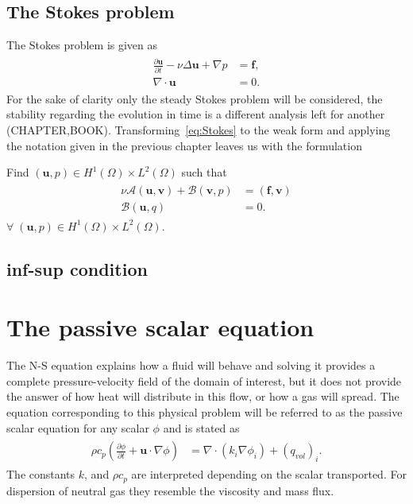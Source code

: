 \subsection{The Stokes problem}
The Stokes problem is given as 
\begin{align}
    \begin{split}
        \frac{\partial \mathbf{u}}{\partial t} - \nu \Delta \mathbf{u} + \nabla p &= 
    \mathbf{f} , \\
		\nabla \cdot \mathbf{u} &= 0.
    \end{split}
	\label{eq:Stokes}
\end{align}
For the sake of clarity only the steady Stokes problem will be considered, the stability regarding
the evolution in time is a different analysis left for another (CHAPTER,BOOK).
Transforming~\ref{eq:Stokes} to the weak form and applying the notation given
in the previous chapter leaves us with the formulation

Find $(\mathbf{u}, p) \in H^1(\Omega)\times L^2(\Omega)$ such that 
\begin{align}
    \begin{split}
        \nu\mathcal{A}(\mathbf{u},\mathbf{v})
        +\mathcal{B}(\mathbf{v},p) &= (\mathbf{f},\mathbf{v}) \\
        \mathcal{B}(\mathbf{u},q) &= 0.
    \end{split}
	\label{eq:Sweak}
\end{align}
$\forall\; (\mathbf{u}, p) \in H^1(\Omega)\times L^2(\Omega)$.
%

\subsection{inf-sup condition}

\section{The passive scalar equation}
The N-S equation explains how a fluid will behave and solving it provides a complete pressure-velocity field of the 
domain of interest, but it does not provide the answer of how heat will distribute in this flow, or how a gas will spread.
The equation corresponding to this physical problem will be referred to as the passive scalar equation for any scalar 
$\phi$ and is stated as 
\begin{align}
    \begin{split}
        \rho c_p(\frac{\partial \phi}{\partial t} + \mathbf{u}\cdot \nabla\phi) 
        &= \nabla \cdot(k_i\nabla \phi_i)+ (q_{vol})_i.
    \end{split}
	\label{eq:PS}
\end{align}
The constants  $k$, and $\rho c_p$ are interpreted depending on 
the scalar transported. For dispersion of neutral gas they 
resemble the viscosity and mass flux. 

